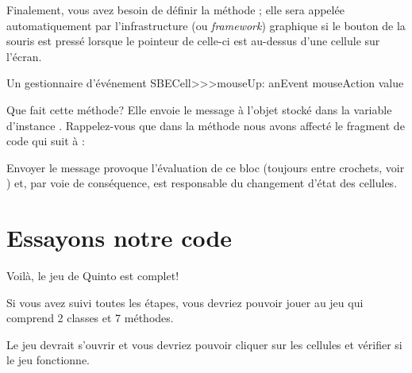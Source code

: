 \documentclass[a4paper,10pt,twoside]{book}
\begin{document}

Finalement, vous avez besoin de définir la méthode ; elle
sera appelée automatiquement par l'infrastructure (ou \emph{framework})
graphique si le bouton de la souris est pressé lorsque le pointeur de
celle-ci est au-dessus d'une cellule sur l'écran.

\begin{method}[sbecellmouseup]{Un gestionnaire d'événement}
SBECell>>>mouseUp: anEvent
   mouseAction value
\end{method}


Que fait cette méthode? Elle envoie le message  à l'objet
stocké dans la variable d'instance . 
Rappelez-vous que dans la méthode 
nous avons affecté le fragment de code qui suit à :


\noindent
Envoyer le message  provoque l'évaluation de ce bloc
(toujours entre crochets, voir ) et, par voie de
conséquence, est responsable du changement d'état des cellules.

\section{Essayons notre code}

Voilà, le jeu de Quinto est complet!

Si vous avez suivi toutes les étapes, vous devriez pouvoir jouer au jeu qui comprend 2 classes et 7 méthodes.


Le jeu devrait s'ouvrir et vous devriez pouvoir cliquer sur les cellules et vérifier si le jeu fonctionne.
\end{document}
